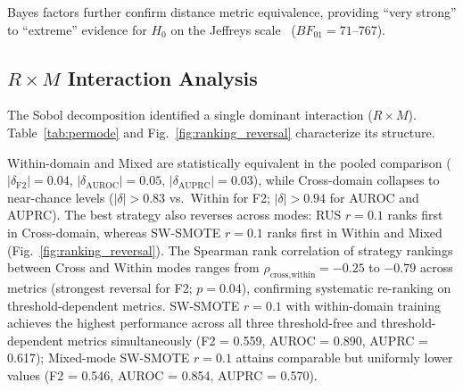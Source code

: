 \documentclass[lettersize,journal]{IEEEtran}
\begin{document}
Bayes factors further confirm distance metric equivalence, providing ``very strong'' to ``extreme'' evidence for $H_0$ on the Jeffreys scale~\cite{jeffreys1961} ($BF_{01} = 71$--$767$).

\subsection{$R \times M$ Interaction Analysis}
\label{sec:interaction_results}
The Sobol decomposition identified a single dominant interaction ($R \times M$).
Table~\ref{tab:permode} and Fig.~\ref{fig:ranking_reversal} characterize its structure.

Within-domain and Mixed are statistically equivalent in the pooled comparison ($|\delta_{\mathrm{F2}}| = 0.04$, $|\delta_{\mathrm{AUROC}}| = 0.05$, $|\delta_{\mathrm{AUPRC}}| = 0.03$), while Cross-domain collapses to near-chance levels ($|\delta| > 0.83$ vs.\ Within for F2; $|\delta| > 0.94$ for AUROC and AUPRC).
The best strategy also reverses across modes: RUS $r{=}0.1$ ranks first in Cross-domain, whereas SW-SMOTE $r{=}0.1$ ranks first in Within and Mixed (Fig.~\ref{fig:ranking_reversal}).
The Spearman rank correlation of strategy rankings between Cross and Within modes ranges from $\rho_{\text{cross,within}} = -0.25$ to $-0.79$ across metrics (strongest reversal for F2; $p = 0.04$), confirming systematic re-ranking on threshold-dependent metrics.
SW-SMOTE $r{=}0.1$ with within-domain training achieves the highest performance across all three threshold-free and threshold-dependent metrics simultaneously (F2 = 0.559, AUROC = 0.890, AUPRC = 0.617); Mixed-mode SW-SMOTE $r{=}0.1$ attains comparable but uniformly lower values (F2 = 0.546, AUROC = 0.854, AUPRC = 0.570).
\end{document}
